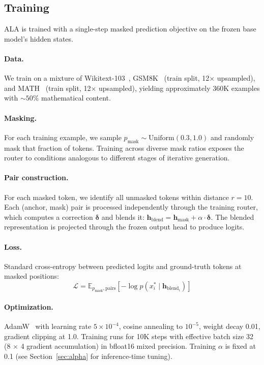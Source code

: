 \documentclass{article} %
\newcommand{\pmask}{p_{\text{mask}}}
\newcommand{\hmask}{\mathbf{h}_{\text{mask}}}
\newcommand{\hblend}{\mathbf{h}_{\text{blend}}}
\newcommand{\deltaH}{\boldsymbol{\delta}}
\begin{document}
\subsection{Training}

ALA is trained with a single-step masked prediction objective on the frozen base model's hidden states.

\paragraph{Data.}
We train on a mixture of Wikitext-103~\citep{merity2016wikitext}, GSM8K~\citep{cobbe2021gsm8k} (train split, 12$\times$ upsampled), and MATH~\citep{hendrycks2021math} (train split, 12$\times$ upsampled), yielding approximately 360K examples with ${\sim}50\%$ mathematical content.

\paragraph{Masking.}
For each training example, we sample $\pmask \sim \text{Uniform}(0.3, 1.0)$ and randomly mask that fraction of tokens.
Training across diverse mask ratios exposes the router to conditions analogous to different stages of iterative generation.

\paragraph{Pair construction.}
For each masked token, we identify all unmasked tokens within distance $r{=}10$.
Each (anchor, mask) pair is processed independently through the training router, which computes a correction $\deltaH$ and blends it: $\hblend = \hmask + \alpha \cdot \deltaH$.
The blended representation is projected through the frozen output head to produce logits.

\paragraph{Loss.}
Standard cross-entropy between predicted logits and ground-truth tokens at masked positions:
\begin{equation}
    \mathcal{L} = \mathbb{E}_{\pmask, \text{pairs}} \left[ -\log p(x_i^* \mid \hblend_i) \right]
\end{equation}

\paragraph{Optimization.}
AdamW~\citep{loshchilov2017adamw} with learning rate $5{\times}10^{-4}$, cosine annealing to $10^{-5}$, weight decay 0.01, gradient clipping at 1.0.
Training runs for 10K steps with effective batch size 32 (8 $\times$ 4 gradient accumulation) in bfloat16 mixed precision.
Training $\alpha$ is fixed at 0.1 (see Section~\ref{sec:alpha} for inference-time tuning).
\end{document}
